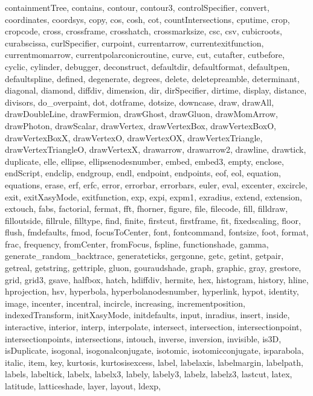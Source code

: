 {{  containmentTree, contains, contour, contour3, controlSpecifier, convert,
  coordinates, coordsys, copy, cos, cosh, cot, countIntersections, cputime,
  crop, cropcode, cross, crossframe, crosshatch, crossmarksize, csc, csv,
  cubicroots, curabscissa, curlSpecifier, curpoint, currentarrow,
  currentexitfunction, currentmomarrow, currentpolarconicroutine, curve, cut,
  cutafter, cutbefore, cyclic, cylinder, debugger, deconstruct, defaultdir,
  defaultformat, defaultpen, defaultspline, defined, degenerate, degrees,
  delete, deletepreamble, determinant, diagonal, diamond, diffdiv, dimension,
  dir, dirSpecifier, dirtime, display, distance, divisors, do_overpaint, dot,
  dotframe, dotsize, downcase, draw, drawAll, drawDoubleLine, drawFermion,
  drawGhost, drawGluon, drawMomArrow, drawPhoton, drawScalar, drawVertex,
  drawVertexBox, drawVertexBoxO, drawVertexBoxX, drawVertexO, drawVertexOX,
  drawVertexTriangle, drawVertexTriangleO, drawVertexX, drawarrow, drawarrow2,
  drawline, drawtick, duplicate, elle, ellipse, ellipsenodesnumber, embed,
  embed3, empty, enclose, endScript, endclip, endgroup, endl, endpoint,
  endpoints, eof, eol, equation, equations, erase, erf, erfc, error, errorbar,
  errorbars, euler, eval, excenter, excircle, exit, exitXasyMode, exitfunction,
  exp, expi, expm1, exradius, extend, extension, extouch, fabs, factorial,
  fermat, fft, fhorner, figure, file, filecode, fill, filldraw, filloutside,
  fillrule, filltype, find, finite, firstcut, firstframe, fit, fixedscaling,
  floor, flush, fmdefaults, fmod, focusToCenter, font, fontcommand, fontsize,
  foot, format, frac, frequency, fromCenter, fromFocus, fspline, functionshade,
  gamma, generate_random_backtrace, generateticks, gergonne, getc, getint,
  getpair, getreal, getstring, gettriple, gluon, gouraudshade, graph, graphic,
  gray, grestore, grid, grid3, gsave, halfbox, hatch, hdiffdiv, hermite, hex,
  histogram, history, hline, hprojection, hsv, hyperbola, hyperbolanodesnumber,
  hyperlink, hypot, identity, image, incenter, incentral, incircle, increasing,
  incrementposition, indexedTransform, initXasyMode, initdefaults, input,
  inradius, insert, inside, interactive, interior, interp, interpolate,
  intersect, intersection, intersectionpoint, intersectionpoints,
  intersections, intouch, inverse, inversion, invisible, is3D, isDuplicate,
  isogonal, isogonalconjugate, isotomic, isotomicconjugate, isparabola, italic,
  item, key, kurtosis, kurtosisexcess, label, labelaxis, labelmargin,
  labelpath, labels, labeltick, labelx, labelx3, labely, labely3, labelz,
  labelz3, lastcut, latex, latitude, latticeshade, layer, layout, ldexp,
}}
